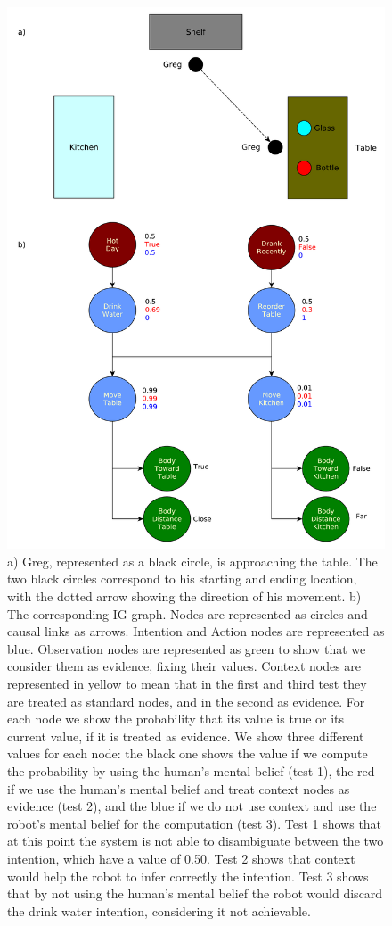 \begin{figure}[ht!]
	\centering
	\includegraphics[scale=0.4]{img/observer/ig_exp1.pdf}
	\caption[IG Example 1]{a) Greg, represented as a black circle, is approaching the table. The two black circles correspond to his starting and ending location, with the dotted arrow showing the direction of his movement. b) The corresponding IG graph. Nodes are represented as circles and causal links as arrows. Intention and Action nodes are represented as blue. Observation nodes are represented as green to show that we consider them as evidence, fixing their values. Context nodes are represented in yellow to mean that in the first and third test they are treated as standard nodes, and in the second as evidence.
 	 For each node we show the probability that its value is true or its current value, if it is treated as evidence. We show three different values for each node: the black one shows the value if we compute the probability by using the human's mental belief (test 1), the red if we use the human's mental belief and treat context nodes as evidence (test 2), and the blue if we do not use context and use the robot's mental belief for the computation (test 3). Test 1 shows that at this point the system is not able to disambiguate between the two intention, which have a value of 0.50. Test 2 shows that context would help the robot to infer correctly the intention. Test 3 shows that by not using the human's mental belief the robot would discard the drink water intention, considering it not achievable.}
	\label{fig:intention-ig_exp1}
\end{figure}

